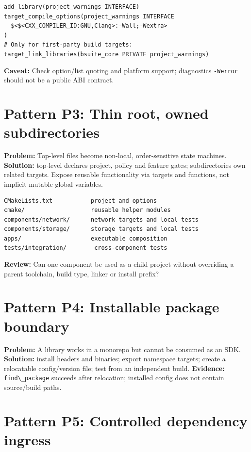 \documentclass[11pt,letterpaper,oneside]{report}
\providecommand{\passthrough}[1]{#1}
\begin{document}
\begin{lstlisting}
add_library(project_warnings INTERFACE)
target_compile_options(project_warnings INTERFACE
  $<$<CXX_COMPILER_ID:GNU,Clang>:-Wall;-Wextra>
)
# Only for first-party build targets:
target_link_libraries(bsuite_core PRIVATE project_warnings)
\end{lstlisting}

\textbf{Caveat:} Check option/list quoting and platform support;
diagnostics \passthrough{\lstinline!-Werror!} should not be a public ABI
contract.

\section{Pattern P3: Thin root, owned
subdirectories}\label{pattern-p3-thin-root-owned-subdirectories}

\textbf{Problem:} Top-level files become non-local, order-sensitive
state machines. \textbf{Solution:} top-level declares project, policy
and feature gates; subdirectories own related targets. Expose reusable
functionality via targets and functions, not implicit mutable global
variables.

\begin{lstlisting}
CMakeLists.txt           project and options
cmake/                   reusable helper modules
components/network/      network targets and local tests
components/storage/      storage targets and local tests
apps/                    executable composition
tests/integration/        cross-component tests
\end{lstlisting}

\textbf{Review:} Can one component be used as a child project without
overriding a parent toolchain, build type, linker or install prefix?

\section{Pattern P4: Installable package
boundary}\label{pattern-p4-installable-package-boundary}

\textbf{Problem:} A library works in a monorepo but cannot be consumed
as an SDK. \textbf{Solution:} install headers and binaries; export
namespace targets; create a relocatable config/version file; test from
an independent build. \textbf{Evidence:}
\passthrough{\lstinline!find\_package!} succeeds after relocation;
installed config does not contain source/build paths.

\section{Pattern P5: Controlled dependency
ingress}\label{pattern-p5-controlled-dependency-ingress}
\end{document}
